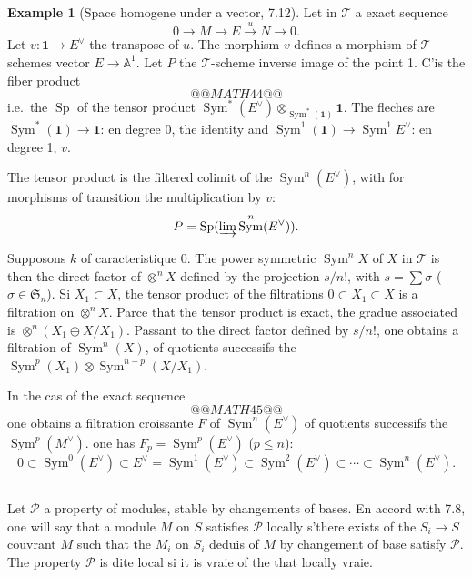 \documentclass[12pt,a4paper]{article}
\theoremstyle{plain}
\theoremstyle{definition}
\newtheorem{example}[theorem]{Example}
\DeclareMathOperator{\Sp}{Sp}
\DeclareMathOperator{\Sym}{Sym}
\begin{document}
\begin{example}[Space homogene under a vector, 7.12]
Let in $\mathcal{T}$ a exact sequence
\[
0 \to M \to E \xrightarrow{u} N \to 0.
\]
Let $v : \mathbf{1} \to E^\vee$ the transpose of $u$. The morphism $v$ defines a morphism of $\mathcal{T}$-schemes vector $E \to \mathbb{A}^1$. Let $P$ the $\mathcal{T}$-scheme inverse image of the point 1. C'is the fiber product
\[
@@MATH44@@
\]
i.e.~the $\Sp$ of the tensor product $\Sym^*(E^\vee) \otimes_{\Sym^*(\mathbf{1})} \mathbf{1}$. The fleches are $\Sym^*(\mathbf{1}) \to \mathbf{1}$: en degree 0, the identity and $\Sym^1(\mathbf{1}) \to \Sym^1 E^\vee$: en degree 1, $v$.

The tensor product is the filtered colimit of the $\Sym^n(E^\vee)$, with for morphisms of transition the multiplication by $v$:
\[
P = \Sp(\varinjlim \Sym^n(E^\vee)).
\]

Supposons $k$ of caracteristique 0. The power symmetric $\Sym^n X$ of $X$ in $\mathcal{T}$ is then the direct factor of $\otimes^n X$ defined by the projection $s/n!$, with $s = \sum \sigma$ ($\sigma \in \mathfrak{S}_n$). Si $X_1 \subset X$, the tensor product of the filtrations $0 \subset X_1 \subset X$ is a filtration on $\otimes^n X$. Parce that the tensor product is exact, the gradue associated is $\otimes^n (X_1 \oplus X/X_1)$. Passant to the direct factor defined by $s/n!$, one obtains a filtration of $\Sym^n(X)$, of quotients successifs the $\Sym^p(X_1) \otimes \Sym^{n-p}(X/X_1)$.

In the cas of the exact sequence
\[
@@MATH45@@
\]
one obtains a filtration croissante $F$ of $\Sym^n(E^\vee)$ of quotients successifs the $\Sym^p(M^\vee)$. one has $F_p = \Sym^p(E^\vee)$ ($p \leq n$):
\[
0 \subset \Sym^0(E^\vee) \subset E^\vee = \Sym^1(E^\vee) \subset \Sym^2(E^\vee) \subset \cdots \subset \Sym^n(E^\vee).
\]
\end{example}

\subsection{}

Let $\mathcal{P}$ a property of modules, stable by changements of bases. En accord with 7.8, one will say that a module $M$ on $S$ satisfies $\mathcal{P}$ locally s'there exists of the $S_i \to S$ couvrant $M$ such that the $M_i$ on $S_i$ deduis of $M$ by changement of base satisfy $\mathcal{P}$. The property $\mathcal{P}$ is dite local si it is vraie of the that locally vraie.
\end{document}
